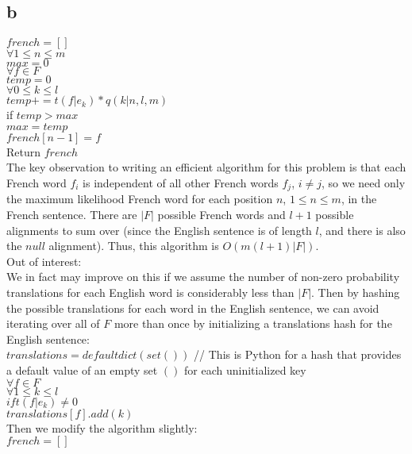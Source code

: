 \documentclass[twoside]{homework}
\begin{document}
\subsection*{b}
$french = [ ]$ \\
$\forall 1 \leq n \leq m$ \\
\indent $max = 0$ \\
\indent $\forall f \in F$ \\
\indent \indent $temp = 0$ \\
\indent \indent $\forall 0 \leq k \leq l$ \\
\indent \indent \indent $temp += t(f|e_k) * q(k|n,l,m)$ \\
\indent \indent if $temp > max$ \\
\indent \indent \indent $max = temp$ \\
\indent \indent \indent $french[n-1] = f$ \\
Return $french$ \\
The key observation to writing an efficient algorithm for this problem is that each French word $f_i$ is independent of all other French words $f_j$, $i \neq j$, so we need only the maximum likelihood French word for each position $n$, $1 \leq n \leq m$, in the French sentence.  There are $|F|$ possible French words and $l + 1$ possible alignments to sum over (since the English sentence is of length $l$, and there is also the $null$ alignment).  Thus, this algorithm is $O(m(l+1)|F|)$. \\
Out of interest: \\
We in fact may improve on this if we assume the number of non-zero probability translations for each English word is considerably less than $|F|$.  Then by hashing the possible translations for each word in the English sentence, we can avoid iterating over all of $F$ more than once by initializing a translations hash for the English sentence: \\
$translations = defaultdict(set())$ // This is Python for a hash that provides a default value of an empty set $()$ for each uninitialized key \\
$\forall f \in F$ \\
\indent $\forall 1 \leq k \leq l$ \\
\indent \indent $if t(f|e_k) \neq 0$ \\
\indent \indent \indent $translations[f].add(k)$ \\
Then we modify the algorithm slightly: \\
$french = [ ]$ \\
\end{document}
